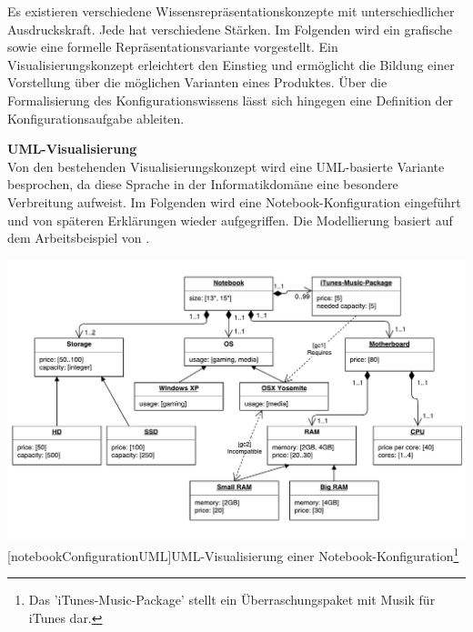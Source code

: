 \documentclass[12pt,a4paper,bibliography=totocnumbered,listof=totoc]{scrartcl}
\begin{document}
Es existieren verschiedene Wissensrepräsentationskonzepte mit unterschiedlicher Ausdruckskraft. Jede hat verschiedene Stärken. Im Folgenden wird ein grafische sowie eine formelle Repräsentationsvariante vorgestellt. Ein Visualisierungskonzept erleichtert den Einstieg und ermöglicht die Bildung einer Vorstellung über die möglichen Varianten eines Produktes. Über die Formalisierung des Konfigurationswissens lässt sich hingegen eine Definition der Konfigurationsaufgabe ableiten.

\textbf{UML-Visualisierung}\\
Von den bestehenden Visualisierungskonzept wird eine UML-basierte Variante besprochen, da diese Sprache in der Informatikdomäne eine besondere Verbreitung aufweist. Im Folgenden wird eine Notebook-Konfiguration eingeführt und von späteren Erklärungen wieder aufgegriffen. Die Modellierung basiert auf dem Arbeitsbeispiel von \citep{felferning14}.

\vspace{1em}
\begin{minipage}{\linewidth}
	\centering
	\includegraphics[width=1\linewidth]{Abbildungen/notebookConfigurationUML.pdf}
	[notebookConfigurationUML]{UML-Visualisierung einer Notebook-Konfiguration\footnote{Das 'iTunes-Music-Package' stellt ein Überraschungspaket mit Musik für iTunes dar.}}
	\label{fig:notebookConfigurationUML}
\end{minipage}
\vspace{1em}
\end{document}
